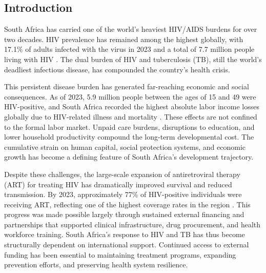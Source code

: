 \documentclass[letterpaper,12pt]{article}
\theoremstyle{definition}
\begin{document}
\begin{spacing}{1.5}


\newpage

\section{Introduction}\label{SecIntro}

South Africa has carried one of the world's heaviest HIV/AIDS burdens for over two decades. HIV prevalence has remained among the highest globally, with \num{17.1}\% of adults infected with the virus in 2023 and a total of \num{7.7} million people living with HIV \citep{UNAIDSData2024}. The dual burden of HIV and tuberculosis (TB), still the world's deadliest infectious disease, has compounded the country's health crisis.

This persistent disease burden has generated far-reaching economic and social consequences. As of 2023, \num{5.9} million people between the ages of 15 and 49 were HIV-positive, and South Africa recorded the highest absolute labor income losses globally due to HIV-related illness and mortality \citep{ILO2018}. These effects are not confined to the formal labor market. Unpaid care burdens, disruptions to education, and lower household productivity compound the long-term developmental cost. The cumulative strain on human capital, social protection systems, and economic growth has become a defining feature of South Africa's development trajectory.

Despite these challenges, the large-scale expansion of antiretroviral therapy (ART) for treating HIV has dramatically improved survival and reduced transmission. By 2023, approximately 77\% of HIV-positive individuals were receiving ART, reflecting one of the highest coverage rates in the region \citep{UNAIDSData2024}. This progress was made possible largely through sustained external financing and partnerships that supported clinical infrastructure, drug procurement, and health workforce training. South Africa's response to HIV and TB has thus become structurally dependent on international support. Continued access to external funding has been essential to maintaining treatment programs, expanding prevention efforts, and preserving health system resilience.


\end{spacing}
\end{document}
